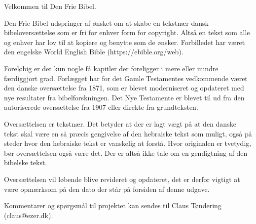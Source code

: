 Velkommen til Den Frie Bibel.

Den Frie Bibel udspringer af ønsket om at skabe en tekstnær dansk bibeloversættelse som er fri for
enhver form for copyright. Altså en tekst som alle og enhver har lov til at kopiere og benytte som
de ønsker. Forbilledet har været den engelske World English Bible (https://ebible.org/web).

Foreløbig er det kun nogle få kapitler der foreligger i mere eller mindre færdiggjort
grad. Forlægget har for det Gamle Testamentes vedkommende været den danske oversættelse
fra 1871, som er blevet moderniseret og opdateret med nye resultater fra bibelforskningen.
Det Nye Testamente er blevet til ud fra den autoriserede oversættelse fra 1907
eller direkte fra grundteksten.

Oversættelsen er tekstnær. Det betyder at der er lagt vægt på at den danske tekst skal være en så
præcis gengivelse af den hebraiske tekst som muligt, også på steder hvor den hebraiske tekst er
vanskelig at forstå. Hvor originalen er tvetydig, bør oversættelsen også være det. Der er altså ikke
tale om en gendigtning af den bibelske tekst.

Oversættelsen vil løbende blive revideret og opdateret, det er derfor vigtigt at være opmærksom på
den dato der står på forsiden af denne udgave.

Kommentarer og spørgsmål til projektet kan sendes til Claus Tøndering (claus@ezer.dk).
